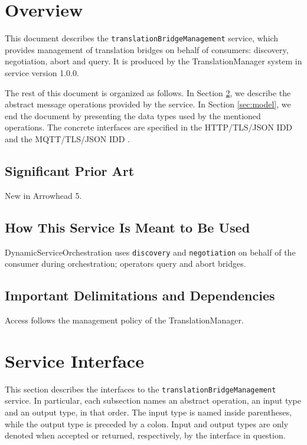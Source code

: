\documentclass[a4paper]{arrowhead}
\begin{document}
\section{Overview}
\label{sec:overview}

This document describes the \texttt{translation\allowbreak{}Bridge\allowbreak{}Management} service, which provides management of translation bridges on behalf of consumers: discovery, negotiation, abort and query.
It is produced by the TranslationManager system \cite{tm-sysd} in service version 1.0.0.

The rest of this document is organized as follows.
In Section \ref{sec:operations}, we describe the abstract message operations provided by the service.
In Section \ref{sec:model}, we end the document by presenting the data types used by the mentioned operations.
The concrete interfaces are specified in the HTTP/TLS/JSON IDD \cite{tm-translationBridgeManagement-http-idd} and the MQTT/TLS/JSON IDD \cite{tm-translationBridgeManagement-mqtt-idd}.

\subsection{Significant Prior Art}

New in Arrowhead 5.

\subsection{How This Service Is Meant to Be Used}

Dynamic\allowbreak{}Service\allowbreak{}Orchestration uses \texttt{discovery} and \texttt{negotiation} on behalf of the consumer during orchestration; operators query and abort bridges.

\subsection{Important Delimitations and Dependencies}
\label{sec:delimitations}

Access follows the management policy of the Translation\allowbreak{}Manager.

\newpage

\section{Service Interface}
\label{sec:operations}

This section describes the interfaces to the \texttt{translation\allowbreak{}Bridge\allowbreak{}Management} service.
In particular, each subsection names an abstract operation, an input type and an output type, in that order.
The input type is named inside parentheses, while the output type is preceded by a colon.
Input and output types are only denoted when accepted or returned, respectively, by the interface in question.
\end{document}
